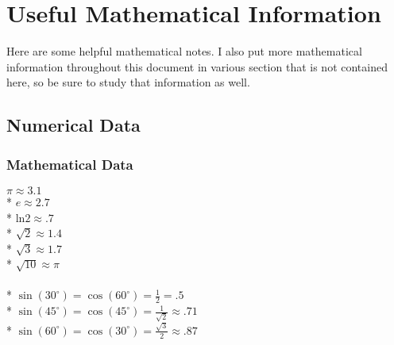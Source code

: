 \section{Useful Mathematical Information}
Here are some helpful mathematical notes.
I also put more mathematical information throughout this document in various section that is not contained here, so be sure to study that information as well.

\subsection{Numerical Data}
\subsubsection{Mathematical Data}
\(\pi\approx3.1\)\\*
\(e\approx2.7\)\\*
\(\mathrm{ln}2\approx.7\)\\*
\(\sqrt{2}\approx1.4\)\\*
\(\sqrt{3}\approx1.7\)\\*
\(\sqrt{10}\approx\pi\)\\\\*
\(\sin(30^{\circ})=\cos(60^{\circ})=\frac{1}{2}=.5\)\\*
\(\sin(45^{\circ})=\cos(45^{\circ})=\frac{1}{\sqrt{2}}\approx.71\)\\*
\(\sin(60^{\circ})=\cos(30^{\circ})=\frac{\sqrt{3}}{2}\approx.87\)
